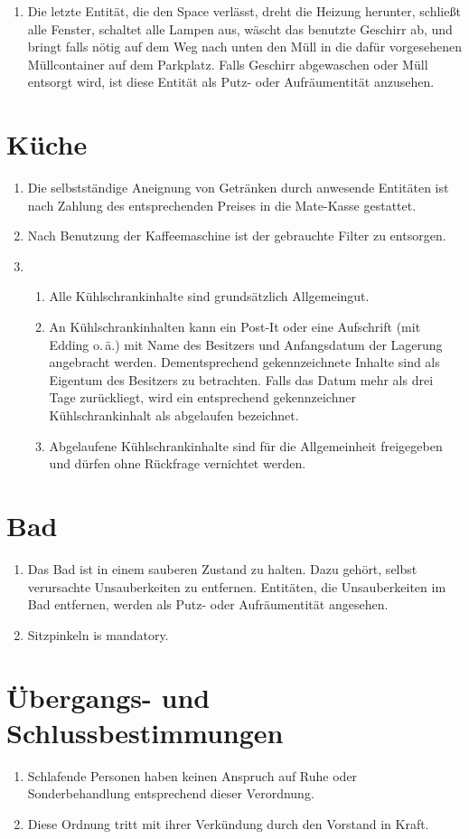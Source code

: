 \documentclass[12pt,a4paper]{scrartcl}
\begin{document}
\begin{enumerate}
  \item Die letzte Entität, die den Space verlässt, dreht die Heizung herunter,
    schließt alle Fenster, schaltet alle Lampen aus, wäscht das benutzte
    Geschirr ab, und bringt falls nötig auf dem Weg nach unten den Müll in die
    dafür vorgesehenen Müllcontainer auf dem Parkplatz. Falls Geschirr
    abgewaschen oder Müll entsorgt wird, ist diese Entität als Putz- oder
    Aufräumentität anzusehen.
\end{enumerate}

\section{Küche}
\begin{enumerate}
  \item Die selbstständige Aneignung von Getränken durch anwesende Entitäten ist
    nach Zahlung des entsprechenden Preises in die Mate-Kasse gestattet.
  \item Nach Benutzung der Kaffeemaschine ist der gebrauchte Filter zu
    entsorgen.
  \item\begin{enumerate}
    \item Alle Kühlschrankinhalte sind grundsätzlich Allgemeingut.
    \item An Kühlschrankinhalten kann ein Post-It oder eine Aufschrift
      (mit Edding o.\,ä.) mit Name des Besitzers und Anfangsdatum der Lagerung
      angebracht werden. Dementsprechend gekennzeichnete Inhalte sind als
      Eigentum des Besitzers zu betrachten. Falls das Datum mehr als drei Tage
      zurückliegt, wird ein entsprechend gekennzeichner Kühlschrankinhalt als
      abgelaufen bezeichnet.
    \item Abgelaufene Kühlschrankinhalte sind für die Allgemeinheit freigegeben
      und dürfen ohne Rückfrage vernichtet werden.
  \end{enumerate}
\end{enumerate}

\section{Bad}
\begin{enumerate}
  \item Das Bad ist in einem sauberen Zustand zu halten. Dazu gehört, selbst
    verursachte Unsauberkeiten zu entfernen. Entitäten, die Unsauberkeiten im
    Bad entfernen, werden als Putz- oder Aufräumentität angesehen.

  \item Sitzpinkeln is mandatory.
\end{enumerate}

\section{Übergangs- und Schlussbestimmungen}
\begin{enumerate}
  \item Schlafende Personen haben keinen Anspruch auf Ruhe oder Sonderbehandlung
    entsprechend dieser Verordnung.

  \item Diese Ordnung tritt mit ihrer Verkündung durch den Vorstand in Kraft.
\end{enumerate}
\end{document}
